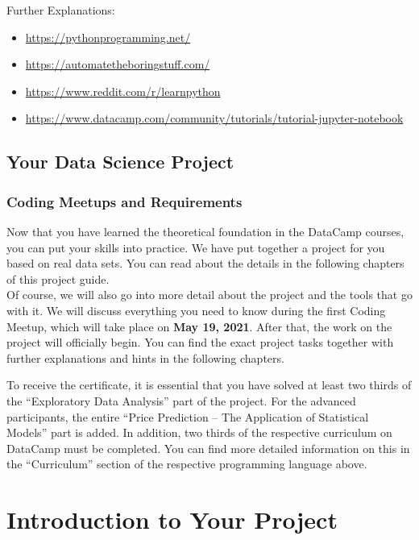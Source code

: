 \documentclass[
  11pt,
]{book}
\providecommand{\tightlist}{%
  \setlength{\itemsep}{0pt}\setlength{\parskip}{0pt}}
\begin{document}
Further Explanations:

\begin{itemize}
\tightlist
\item
  \url{https://pythonprogramming.net/}
\item
  \url{https://automatetheboringstuff.com/}
\item
  \url{https://www.reddit.com/r/learnpython}
\item
  \url{https://www.datacamp.com/community/tutorials/tutorial-jupyter-notebook}
\end{itemize}

\hypertarget{your-data-science-project}{%
\section{Your Data Science Project}\label{your-data-science-project}}

\hypertarget{coding-meetups-and-requirements}{%
\subsection{Coding Meetups and Requirements}\label{coding-meetups-and-requirements}}

Now that you have learned the theoretical foundation in the DataCamp courses, you can put your skills into practice. We have put together a project for you based on real data sets. You can read about the details in the following chapters of this project guide.\\
Of course, we will also go into more detail about the project and the tools that go with it. We will discuss everything you need to know during the first Coding Meetup, which will take place on \textbf{May 19, 2021}. After that, the work on the project will officially begin.
You can find the exact project tasks together with further explanations and hints in the following chapters.

To receive the certificate, it is essential that you have solved at least two thirds of the ``Exploratory Data Analysis'' part of the project. For the advanced participants, the entire ``Price Prediction -- The Application of Statistical Models'' part is added. In addition, two thirds of the respective curriculum on DataCamp must be completed. You can find more detailed information on this in the ``Curriculum'' section of the respective programming language above.

\newpage

\hypertarget{introduction-to-your-project}{%
\chapter{Introduction to Your Project}\label{introduction-to-your-project}}
\end{document}
